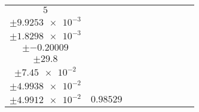 \documentclass[8pt]{article}
\begin{document}
\begin{longtable}[l]{c c c c c c c c c}
$\num{5}$ & \begin{tabular}[c]{@{}c@{}}$\num{0.99253}$ \\ $\pm\num{9.9253e-3}$\end{tabular} & \begin{tabular}[c]{@{}c@{}}$\num{0.18298}$ \\ $\pm\num{1.8298e-3}$\end{tabular} & \begin{tabular}[c]{@{}c@{}}$\num{-20.009}$ \\ $\pm\num{-0.20009}$\end{tabular} & \begin{tabular}[c]{@{}c@{}}$\num{2.98e+3}$ \\ $\pm\num{29.8}$\end{tabular} & \begin{tabular}[c]{@{}c@{}}$\num{7.45}$ \\ $\pm\num{7.45e-2}$\end{tabular} & \begin{tabular}[c]{@{}c@{}}$\num{4.9938}$ \\ $\pm\num{4.9938e-2}$\end{tabular} & \begin{tabular}[c]{@{}c@{}}$\num{4.9912}$ \\ $\pm\num{4.9912e-2}$\end{tabular} & $\num{0.98529}$\\
\bottomrule
\end{longtable}
\end{document}
